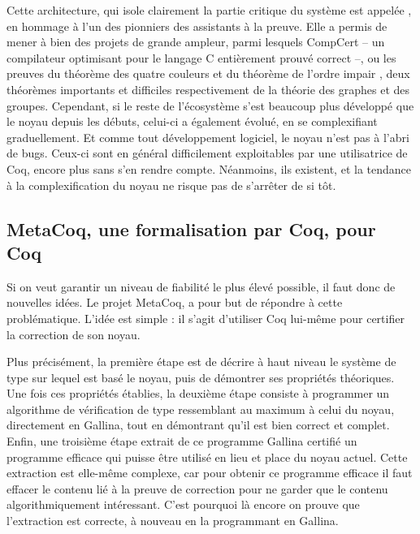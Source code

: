   
  Cette architecture, qui isole clairement la partie critique du système
  est appelée  , en 
  hommage à l’un des pionniers des assistants à la preuve.
  Elle a permis de mener à bien des projets de grande ampleur, parmi lesquels CompCert  – un compilateur optimisant pour le langage C entièrement prouvé correct –, ou les preuves du théorème des quatre couleurs  et du théorème de l’ordre impair , deux théorèmes importants et difficiles respectivement de la théorie des graphes et des groupes.
  Cependant, si le reste de l’écosystème s’est beaucoup plus développé que le noyau depuis les débuts, celui-ci a également évolué, en se complexifiant graduellement.
  Et comme tout développement logiciel, le noyau n’est pas à l’abri de bugs.
  Ceux-ci sont en général difficilement exploitables par une utilisatrice de Coq, encore plus sans s’en rendre compte.
  Néanmoins, ils existent, et la tendance à la complexification du noyau ne risque pas de s’arrêter de si tôt.

\subsection{MetaCoq, une formalisation par Coq, pour Coq}
\label{sec-metacoq}

Si on veut garantir un niveau de fiabilité le plus élevé possible, il faut donc de nouvelles idées.
Le projet MetaCoq, a pour but de répondre à cette problématique.
L’idée est simple : il s’agit d’utiliser Coq lui-même pour certifier la correction de son noyau.

Plus précisément, la première étape est de décrire à haut niveau le système de type sur lequel est basé le noyau, puis de démontrer ses propriétés théoriques.
Une fois ces propriétés établies, la deuxième étape consiste à programmer un algorithme de vérification de type ressemblant au maximum à celui du noyau, directement en Gallina,
tout en démontrant qu’il est bien correct
et complet.
Enfin, une troisième étape extrait de ce programme Gallina certifié
un programme efficace qui puisse être utilisé en lieu et place du noyau actuel.
Cette extraction est elle-même complexe, car pour obtenir ce programme efficace il
faut effacer le contenu lié à la preuve de correction
pour ne garder que le contenu algorithmiquement intéressant.
C’est pourquoi là encore on prouve que l’extraction est correcte,
à nouveau en la programmant en Gallina.

